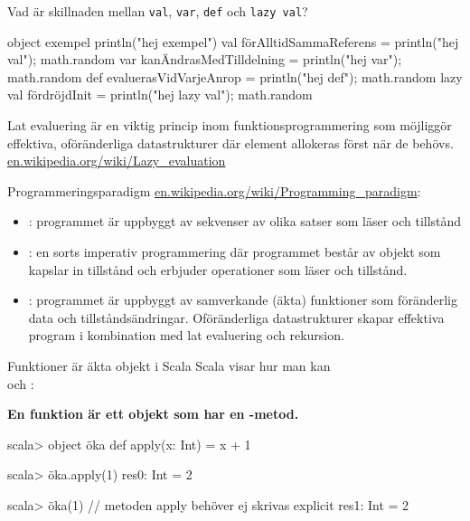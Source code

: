 \begin{Slide}{Vad är skillnaden mellan \texttt{val}, \texttt{var}, \texttt{def} och \texttt{lazy val}?}
\begin{Code}[basicstyle=\ttfamily\fontsize{8}{11}\selectfont]
object exempel {
  println("hej exempel")
  val förAlltidSammaReferens  = { println("hej val"); math.random }
  var kanÄndrasMedTilldelning = { println("hej var"); math.random }
  def evaluerasVidVarjeAnrop  = { println("hej def"); math.random }
  lazy val fördröjdInit  = { println("hej lazy val"); math.random }
}
\end{Code}
\vspace{1em}\pause
Lat evaluering är en viktig princip inom funktionsprogrammering som möjliggör effektiva, oföränderliga datastrukturer där element allokeras först när de behövs. \\
\href{https://en.wikipedia.org/wiki/Lazy_evaluation}{en.wikipedia.org/wiki/Lazy\_evaluation}
\end{Slide}





\begin{Slide}{Programmeringsparadigm}
\href{https://en.wikipedia.org/wiki/Programming_paradigm}{en.wikipedia.org/wiki/Programming\_paradigm}:
\begin{itemize}
\item {}: programmet är uppbyggt av sekvenser av olika satser som läser och  tillstånd
\item {}: en sorts imperativ programmering där programmet består av objekt som kapslar in tillstånd och erbjuder operationer som läser och  tillstånd.
\item {}: programmet är uppbyggt av samverkande (äkta) funktioner som  föränderlig data och tillståndsändringar. Oföränderliga datastrukturer skapar effektiva program i kombination med lat evaluering och rekursion.
\end{itemize}
\end{Slide}


\begin{Slide}{Funktioner är äkta objekt i Scala}
Scala visar hur man kan   \\  och : \\\vspace{0.5em}

\textbf{En funktion är ett objekt som har en -metod.}
\pause
\begin{REPLnonum}
scala> object öka {
         def apply(x: Int) = x + 1
       }

scala> öka.apply(1)
res0: Int = 2

scala> öka(1)   // metoden apply behöver ej skrivas explicit
res1: Int = 2
\end{REPLnonum}
\end{Slide}



